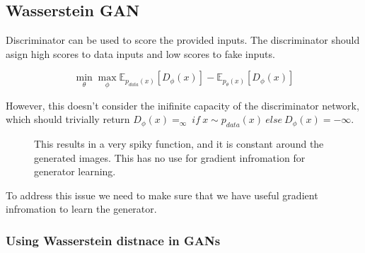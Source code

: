 \documentclass[11pt]{article}
\begin{document}
\subsection{Wasserstein GAN}

Discriminator can be used to score the provided inputs. The discriminator should asign high scores to data inputs and low scores to fake inputs.

\begin{equation}
    \min_\theta \max_\phi \mathbb E_{p_{data}(x)}[D_\phi(x)]-\mathbb E_{p_\theta(x)}[D_\phi(x)]
\end{equation}

However, this doesn't consider the inifinite capacity of the discriminator network, which should trivially return $D_\phi(x)=_\infty\ if\ x\sim p_{data}(x)\ else\ D_\phi(x)=-\infty$.

\begin{figure}[H]
    \centering
    \caption*{This results in a very spiky function, and it is constant around the generated images. This has no use for gradient infromation for generator learning.}
\end{figure}

To address this issue we need to make sure that we have useful gradient infromation to learn the generator.

\subsubsection{Using Wasserstein distnace in GANs}\label{app:gan:Using Wasserstein distnace in GANs}
\end{document}
